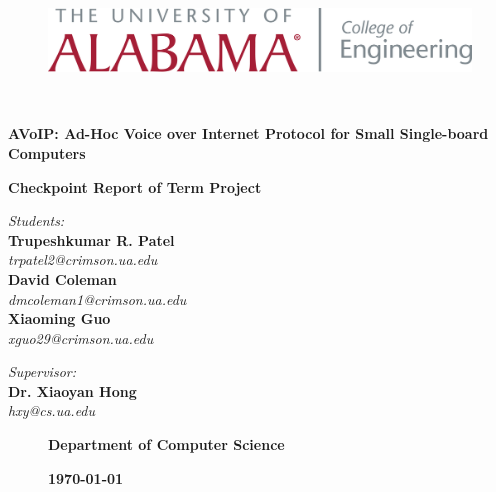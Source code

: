 \begin{titlepage}
	\begin{figure}[t]
		\begin{minipage}{\textwidth}
			\centering
			\includegraphics[scale=0.35]{Images/UA/OfficLogo-Engineering.png}
		\end{minipage}
	\end{figure}

	\quad\\
	\vspace{0.5in}
	\centering
	\begin{spacing}{2.0}
		{ \textbf{\LARGE AVoIP: Ad-Hoc Voice over Internet Protocol for Small Single-board Computers}}
	\end{spacing}
	
	\vspace{1.5in}
	\textbf{\Large Checkpoint Report of Term Project}
	\vspace{3.0in}

	\begin{minipage}{0.49\textwidth}
		\begin{flushleft}
			\textit{{Students:}} \\
			{\textbf{Trupeshkumar R. Patel}}\\
			\textsl{trpatel2@crimson.ua.edu}\\
			{\textbf{David Coleman}}\\
			\textsl{dmcoleman1@crimson.ua.edu}\\
			{\textbf{Xiaoming Guo}}\\
			\textsl{xguo29@crimson.ua.edu}
		\end{flushleft}
	\end{minipage}
	\begin{minipage}{0.5\textwidth}
		\begin{flushright}
			\textit{{Supervisor:}} \\
			{\textbf{Dr. Xiaoyan Hong}}\\
			\textsl{hxy@cs.ua.edu}
		\end{flushright}
	\end{minipage}

	\begin{figure}[b]
		\begin{minipage}{0.55\textwidth}
			\begin{flushleft}
				\textbf{\large Department of Computer Science}
			\end{flushleft}
		\end{minipage}
		\hfill
		\begin{minipage}{0.35\textwidth}
			\begin{flushright}
				\textsc{\textbf{\today}}
			\end{flushright}
		\end{minipage}
	\end{figure}

\end{titlepage}